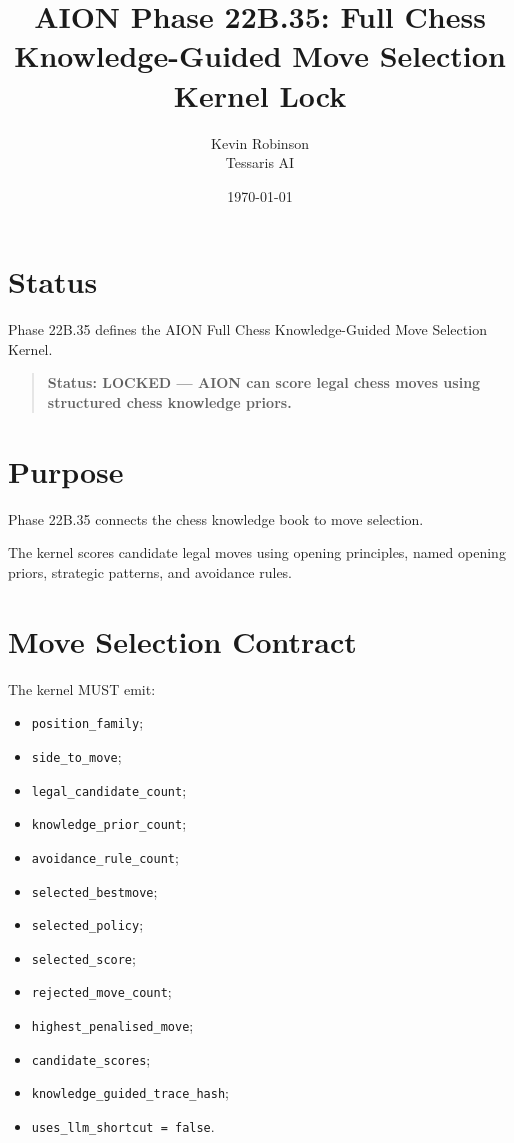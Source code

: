 \documentclass[11pt,a4paper]{article}
\title{\textbf{AION Phase 22B.35: Full Chess Knowledge-Guided Move Selection Kernel Lock}}
\author{Kevin Robinson\\Tessaris AI}
\date{\today}
\begin{document}
\maketitle

\section{Status}

Phase 22B.35 defines the AION Full Chess Knowledge-Guided Move Selection Kernel.

\begin{quote}
\textbf{Status: LOCKED --- AION can score legal chess moves using structured chess knowledge priors.}
\end{quote}

\section{Purpose}

Phase 22B.35 connects the chess knowledge book to move selection.

The kernel scores candidate legal moves using opening principles, named opening priors, strategic patterns, and avoidance rules.

\section{Move Selection Contract}

The kernel MUST emit:

\begin{itemize}
  \item \texttt{position\_family};
  \item \texttt{side\_to\_move};
  \item \texttt{legal\_candidate\_count};
  \item \texttt{knowledge\_prior\_count};
  \item \texttt{avoidance\_rule\_count};
  \item \texttt{selected\_bestmove};
  \item \texttt{selected\_policy};
  \item \texttt{selected\_score};
  \item \texttt{rejected\_move\_count};
  \item \texttt{highest\_penalised\_move};
  \item \texttt{candidate\_scores};
  \item \texttt{knowledge\_guided\_trace\_hash};
  \item \texttt{uses\_llm\_shortcut = false}.
\end{itemize}
\end{document}
